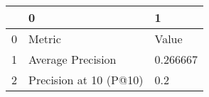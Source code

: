 \begin{tabular}{lll}
\toprule
{} &                       0 &         1 \\
\midrule
0 &                  Metric &     Value \\
1 &       Average Precision &  0.266667 \\
2 &  Precision at 10 (P@10) &       0.2 \\
\bottomrule
\end{tabular}
